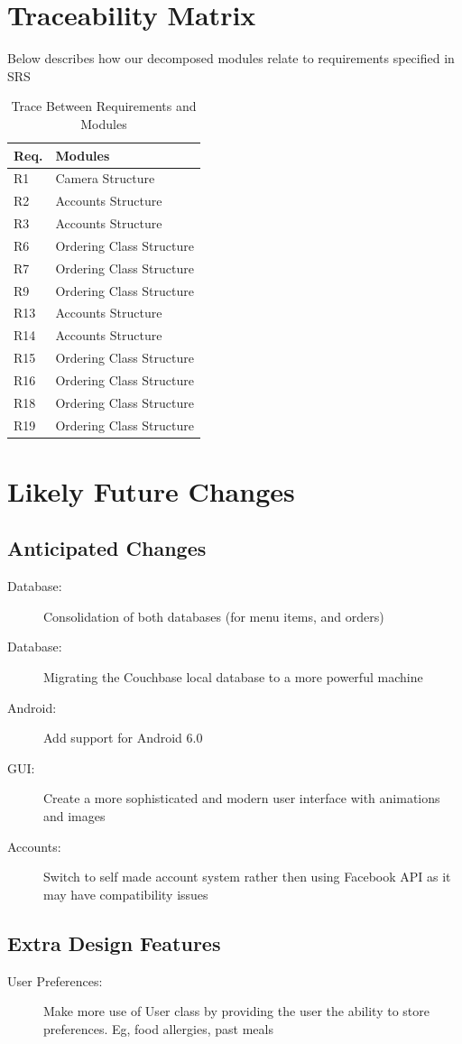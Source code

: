 \documentclass[12pt, titlepage]{article}
\begin{document}
\section{Traceability Matrix}
Below describes how our decomposed modules relate to requirements specified in SRS
\begin{table}[H]
\centering
\begin{tabular}{p{} p{}}
\toprule
\textbf{Req.} & \textbf{Modules}\\
\midrule
R1 & Camera Structure\\
R2 & Accounts Structure\\
R3 & Accounts Structure\\
R6 & Ordering Class Structure\\
R7 & Ordering Class Structure\\
R9 & Ordering Class Structure\\
R13 & Accounts Structure \\
R14 & Accounts Structure\\
R15 & Ordering Class Structure\\
R16 & Ordering Class Structure\\
R18 & Ordering Class Structure\\
R19 & Ordering Class Structure\\
\bottomrule
\end{tabular}
\caption{Trace Between Requirements and Modules}
\label{TblRT}
\end{table}

\section{Likely Future Changes}
\subsection{Anticipated Changes}
\begin{description}
  \item[Database:] Consolidation of both databases (for menu items, and orders)
  \item[Database:] Migrating the Couchbase local database to a more powerful machine
  \item[Android:] Add support for Android 6.0
  \item[GUI:] Create a more sophisticated and modern user interface with animations and images
  \item[Accounts:] Switch to self made account system rather then using Facebook API as it may have compatibility issues
 \end{description}
 
\subsection{Extra Design Features}
\begin{description}
  \item[User Preferences:] Make more use of User class by providing the user the ability to store preferences. Eg, food allergies, past meals
\end{description}
\end{document}
